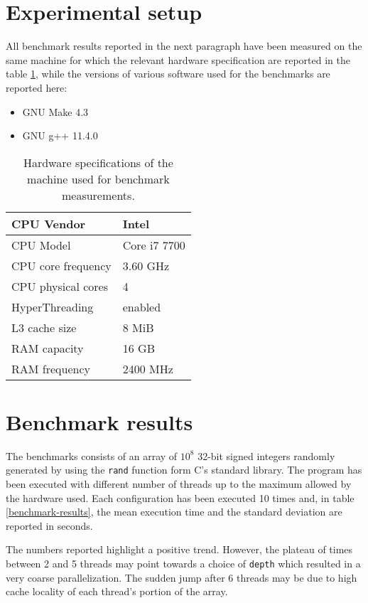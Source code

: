 \documentclass[11pt,a4paper,oneside]{book}
\begin{document}
	\section*{Experimental setup}
	All benchmark results reported in the next paragraph have been measured on the same machine for which the relevant hardware specification are reported in the table \ref{hw-specs}, while the versions of various software used for the benchmarks are reported here:
	
	\begin{itemize}
		\item GNU Make 4.3
		\item GNU g++ 11.4.0
	\end{itemize}

	\begin{table}[!ht]
		\begin{tabular}{|l|l|}
			\hline
			CPU Vendor         & Intel        \\ \hline
			CPU Model          & Core i7 7700 \\ \hline
			CPU core frequency & 3.60 GHz     \\ \hline
			CPU physical cores & 4            \\ \hline
			HyperThreading     & enabled      \\ \hline
			L3 cache size      & 8 MiB        \\ \hline
			RAM capacity       & 16 GB        \\ \hline
			RAM frequency      & 2400 MHz     \\ \hline
		\end{tabular}
		\caption{Hardware specifications of the machine used for benchmark measurements.}
		\label{hw-specs}
	\end{table}
	
	\section*{Benchmark results}
	The benchmarks consists of an array of $10^8$ 32-bit signed integers randomly generated by using the \verb|rand| function form C's standard library. The program has been executed with different number of threads up to the maximum allowed by the hardware used. Each configuration has been executed 10 times and, in table \ref{benchmark-results}, the mean execution time and the standard deviation are reported in seconds.
	
	The numbers reported highlight a positive trend. However, the plateau of times between 2 and 5 threads may point towards a choice of \verb|depth| which resulted in a very coarse parallelization. The sudden jump after 6 threads may be due to high cache locality of each thread's portion of the array.
	
\end{document}
